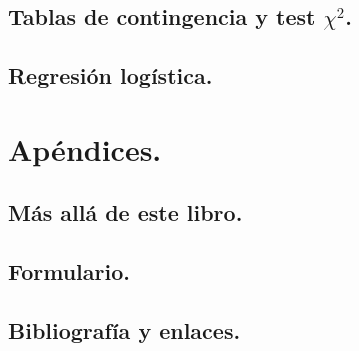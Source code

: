\documentclass[10pt,a4paper]{book}
\begin{document}
\chapter{Tablas de contingencia y test $\chi^2$.}
\label{cap:TablasContingenciaTestChi2}


\chapter{Regresión logística.}
\label{cap:RegresionLogistica}



\newpage
\part*{Apéndices.}
\appendix

\chapter{Más allá de este libro.}
\label{apendice:MasAlla}



\chapter{Formulario.}
\label{apendice:Tablas}
\newpage


%

\chapter{Bibliografía y enlaces.}\label{apendice:comentarioBibliografia}


%

\end{document}
